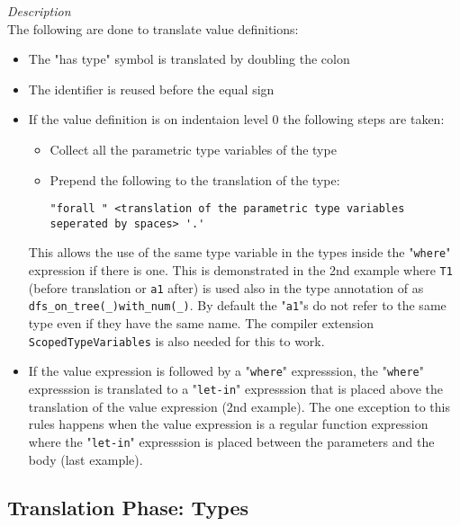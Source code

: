 \documentclass{article}
\begin{document}
\begin{itemize}
\textit{Description}\\

The following are done to translate value definitions:

\begin{itemize}
\item
The "has type" symbol is translated by doubling the colon

\item
The identifier is reused before the equal sign

\item
If the value definition is on indentaion level 0 the following steps are taken:

\begin{itemize}
\item
Collect all the parametric type variables of the type
\item
Prepend the following to the translation of the type:
\begin{verbatim}
"forall " <translation of the parametric type variables seperated by spaces> '.'
\end{verbatim}
\end{itemize}

This allows the use of the same type variable in the types inside the
"\texttt{where}" expression if there is one. This is demonstrated in the 2nd
example where \texttt{T1} (before translation or \texttt{a1} after) is used
also in the type annotation of as \verb|dfs_on_tree(_)with_num(_)|. By default
the "\texttt{a1}"s do not refer to the same type even if they have the same
name.  The compiler extension \texttt{ScopedTypeVariables} is also needed for
this to work.

\item
If the value expression is followed by a "\texttt{where}" expresssion, the
"\texttt{where}" expresssion is translated to a "\texttt{let-in}" expresssion
that is placed above the translation of the value expression (2nd example). The
one exception to this rules happens when the value expression is a regular
function expression where the "\texttt{let-in}" expresssion is placed between
the parameters and the body (last example).

\end{itemize}

\end{itemize}

\newpage
\subsection{Translation Phase: Types}
\end{document}
